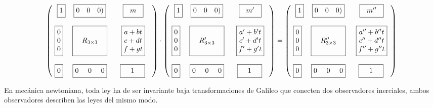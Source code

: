 \begin{footnotesize}
$$\mqty(\ \ 
\boxed{\mqty{1}} & \boxed{\mqty{0&0&0)}} & \boxed{\mqty{\ \  m \ \ }}\\ \\
\boxed{\mqty{0\\0\\0}}&\boxed{ \mqty{ \\ & R_{3\times 3} & \\  \\ } } & \boxed{\mqty{ a+bt\\c+dt\\f+gt}} \\ \\
\boxed{\mqty{0}}&\boxed{\mqty{ 0&\ 0 \ &0 }} & \ \ \,  \boxed{\mqty{\,  &1&}\, }
\ \ \ ) \cdot \mqty(\ \ 
\boxed{\mqty{1}} & \boxed{\mqty{0&0&0)}} & \boxed{\mqty{\ \  m' \ \ }}\\ \\
\boxed{\mqty{0\\0\\0}}&\boxed{ \mqty{ \\ & R'_{3\times 3} & \\  \\ } } & \boxed{\mqty{ a'+b't\\c'+d't\\f'+g't}} \\ \\
\boxed{\mqty{0}}&\boxed{\mqty{ 0&\ 0 \ &0 }} & \ \ \,  \boxed{\mqty{\,  &1&}\, }
\ \ \ ) = \mqty(\ \ 
\boxed{\mqty{1}} & \boxed{\mqty{0&0&0)}} & \boxed{\mqty{\ \  m'' \ \ }}\\ \\
\boxed{\mqty{0\\0\\0}}&\boxed{ \mqty{ \\ & R''_{3\times 3} & \\  \\ } } & \boxed{\mqty{ a''+b''t\\c''+d''t\\f''+g''t}} \\ \\
\boxed{\mqty{0}}&\boxed{\mqty{ 0&\ 0 \ &0 }} & \ \ \,  \boxed{\mqty{\,  &1&}\, }
\ \ \ )$$
\end{footnotesize}


En mecánica newtoniana, toda ley ha de ser invariante baja transformaciones de Galileo que conecten dos observadores inerciales, ambos observadores describen las leyes del mismo modo.

